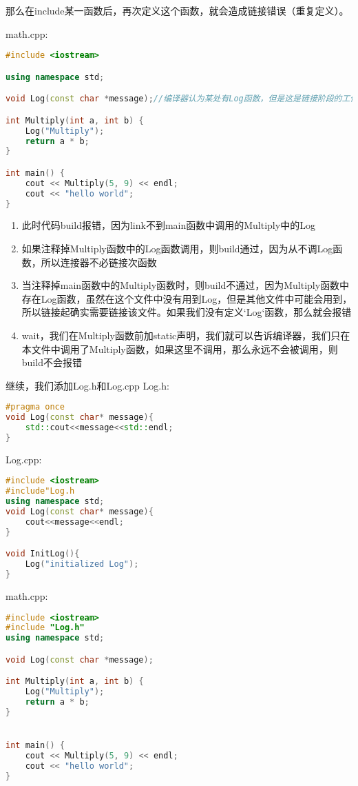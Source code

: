那么在{\ncodestyle include}某一函数后，再次定义这个函数，就会造成链接错误（重复定义）。

math.cpp:

\begin{lstlisting}[language=C++]
#include <iostream>

using namespace std;

void Log(const char *message);//编译器认为某处有Log函数，但是这是链接阶段的工作来找到Log在哪里，编译并不负责

int Multiply(int a, int b) {
    Log("Multiply");
    return a * b;
}

int main() {
    cout << Multiply(5, 9) << endl;
    cout << "hello world";
}
\end{lstlisting}

\begin{enumerate}
	\item 此时代码build报错，因为link不到main函数中调用的Multiply中的Log
	\item 如果注释掉Multiply函数中的Log函数调用，则build通过，因为从不调Log函数，所以连接器不必链接次函数
	\item 当注释掉main函数中的{\ncodestyle Multiply}函数时，则build不通过，因为{\ncodestyle Multiply}函数中存在{\ncodestyle Log}函数，虽然在这个文件中没有用到{\ncodestyle Log}，但是其他文件中可能会用到，所以链接起确实需要链接该文件。如果我们没有定义`Log`函数，那么就会报错
	\item wait，我们在Multiply函数前加{\ncodestyle static}声明，我们就可以告诉编译器，我们只在本文件中调用了{\ncodestyle Multiply}函数，如果这里不调用，那么永远不会被调用，则build不会报错
\end{enumerate}


继续，我们添加Log.h和Log.cpp
Log.h:
\begin{lstlisting}[language=C++]
#pragma once
void Log(const char* message){
    std::cout<<message<<std::endl;
}
\end{lstlisting}
Log.cpp:
\begin{lstlisting}[language=C++]
#include <iostream>
#include"Log.h
using namespace std;
void Log(const char* message){
    cout<<message<<endl;
}

void InitLog(){
    Log("initialized Log");
}
\end{lstlisting}
math.cpp:
\begin{lstlisting}[language=C++]
#include <iostream>
#include "Log.h"
using namespace std;

void Log(const char *message);

int Multiply(int a, int b) {
    Log("Multiply");
    return a * b;
}


int main() {
    cout << Multiply(5, 9) << endl;
    cout << "hello world";
}
\end{lstlisting}

